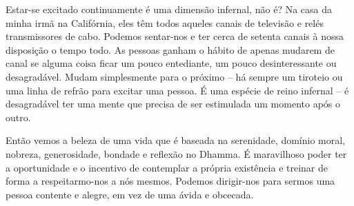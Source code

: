 Estar-se excitado continuamente é uma dimensão infernal, não é? Na casa da minha
irmã na Califórnia, eles têm todos aqueles canais de televisão e relés
transmissores de cabo. Podemos sentar-nos e ter cerca de setenta canais à nossa
disposição o tempo todo. As pessoas ganham o hábito de apenas mudarem de canal
se alguma coisa ficar um pouco entediante, um pouco desinteressante ou
desagradável. Mudam simplesmente para o próximo -- há sempre um tiroteio ou uma
linha de refrão para excitar uma pessoa. É uma espécie de reino infernal -- é
desagradável ter uma mente que precisa de ser estimulada um momento após o
outro.

Então vemos a beleza de uma vida que é baseada na serenidade, domínio moral,
nobreza, generosidade, bondade e reflexão no Dhamma. É maravilhoso poder
ter a oportunidade e o incentivo de contemplar a própria existência e treinar de
forma a respeitarmo-nos a nós mesmos. Podemos dirigir-nos para sermos uma pessoa
contente e alegre, em vez de uma ávida e obcecada.

